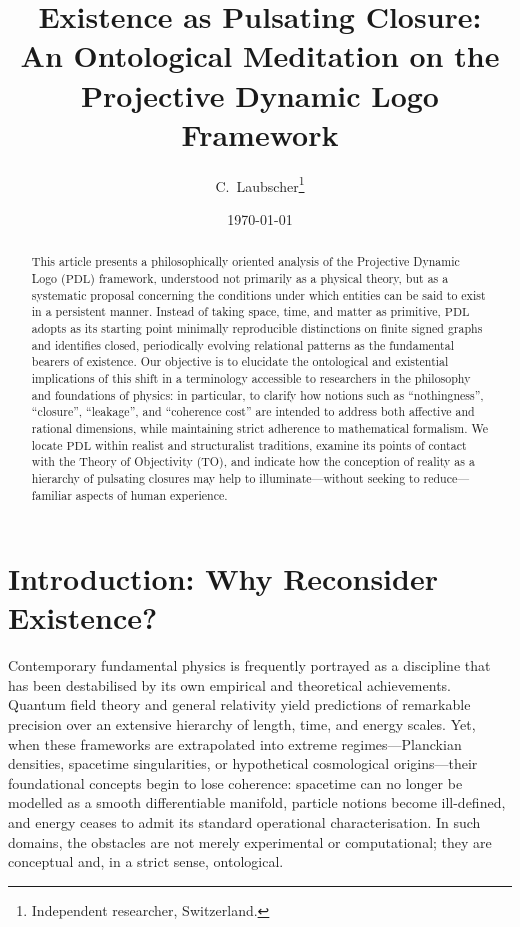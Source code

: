 \documentclass{article}
\theoremstyle{definition}
\newcommand{\PDL}{\ensuremath{\mathrm{PDL}}}
\begin{document}
\title{Existence as Pulsating Closure:\\[4pt]
An Ontological Meditation on the Projective Dynamic Logo Framework}

\author{C.~Laubscher\thanks{Independent researcher, Switzerland.}\\[4pt]}

\date{\small \today}

\maketitle

\begin{abstract}
This article presents a philosophically oriented analysis of the Projective Dynamic Logo (\PDL) framework, understood not primarily as a physical theory, but as a systematic proposal concerning the conditions under which entities can be said to exist in a persistent manner.%
\cite{PDL_Main_2026,PDL_Intro_2026,PDL_Position_2026}
Instead of taking space, time, and matter as primitive, \PDL{} adopts as its starting point minimally reproducible distinctions on finite signed graphs and identifies closed, periodically evolving relational patterns as the fundamental bearers of existence.%
\cite{PDL_Main_2026,PDL_TO_Dialogue_2026}
Our objective is to elucidate the ontological and existential implications of this shift in a terminology accessible to researchers in the philosophy and foundations of physics: in particular, to clarify how notions such as ``nothingness'', ``closure'', ``leakage'', and ``coherence cost'' are intended to address both affective and rational dimensions, while maintaining strict adherence to mathematical formalism.
We locate \PDL{} within realist and structuralist traditions, examine its points of contact with the Theory of Objectivity (TO), and indicate how the conception of reality as a hierarchy of pulsating closures may help to illuminate—without seeking to reduce—familiar aspects of human experience.
\end{abstract}

\section{Introduction: Why Reconsider Existence?}
\label{sec:intro}

Contemporary fundamental physics is frequently portrayed as a discipline that has been destabilised by its own empirical and theoretical achievements.
Quantum field theory and general relativity yield predictions of remarkable precision over an extensive hierarchy of length, time, and energy scales.
Yet, when these frameworks are extrapolated into extreme regimes—Planckian densities, spacetime singularities, or hypothetical cosmological origins—their foundational concepts begin to lose coherence: spacetime can no longer be modelled as a smooth differentiable manifold, particle notions become ill-defined, and energy ceases to admit its standard operational characterisation.%
\cite{PDL_Main_2026,PDL_Intro_2026}
In such domains, the obstacles are not merely experimental or computational; they are conceptual and, in a strict sense, ontological.
\end{document}

